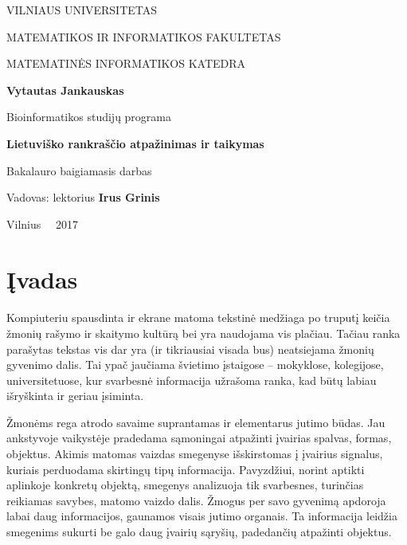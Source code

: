 \documentclass[a4paper,12pt]{article}
\begin{document}
\thispagestyle{empty} %

\begin{center}
 VILNIAUS UNIVERSITETAS 
 
MATEMATIKOS IR INFORMATIKOS FAKULTETAS

MATEMATINĖS INFORMATIKOS KATEDRA

\vspace{4cm}

\textbf{Vytautas Jankauskas} \ \

Bioinformatikos studijų programa


\vspace{3cm}

\textbf{\Large Lietuviško rankraščio atpažinimas ir taikymas}

Bakalauro baigiamasis darbas 

\vspace{4cm}

Vadovas: lektorius \textbf{Irus Grinis} \ \

\vfill

Vilnius \ \  2017
\end{center}

\clearpage

\tableofcontents
\clearpage

\section*{Įvadas}

\paragraph{}Kompiuteriu spausdinta ir ekrane matoma tekstinė medžiaga po truputį keičia žmonių rašymo ir skaitymo kultūrą bei yra naudojama vis plačiau. Tačiau ranka parašytas tekstas vis dar yra (ir tikriausiai visada bus) neatsiejama žmonių gyvenimo dalis. Tai ypač jaučiama švietimo įstaigose – mokyklose, kolegijose, universitetuose, kur svarbesnė informacija užrašoma ranka, kad būtų labiau išryškinta ir geriau įsiminta.

Žmonėms rega atrodo savaime suprantamas ir elementarus jutimo būdas. Jau ankstyvoje vaikystėje pradedama sąmoningai atpažinti įvairias spalvas, formas, objektus. Akimis matomas vaizdas smegenyse išskirstomas į įvairius signalus, kuriais perduodama skirtingų tipų informacija. Pavyzdžiui, norint aptikti aplinkoje konkretų objektą, smegenys analizuoja tik svarbesnes, turinčias reikiamas savybes, matomo vaizdo dalis. Žmogus per savo gyvenimą apdoroja labai daug informacijos, gaunamos visais jutimo organais. Ta informacija leidžia smegenims sukurti be galo daug įvairių sąryšių, padedančių atpažinti objektus.
\end{document}
